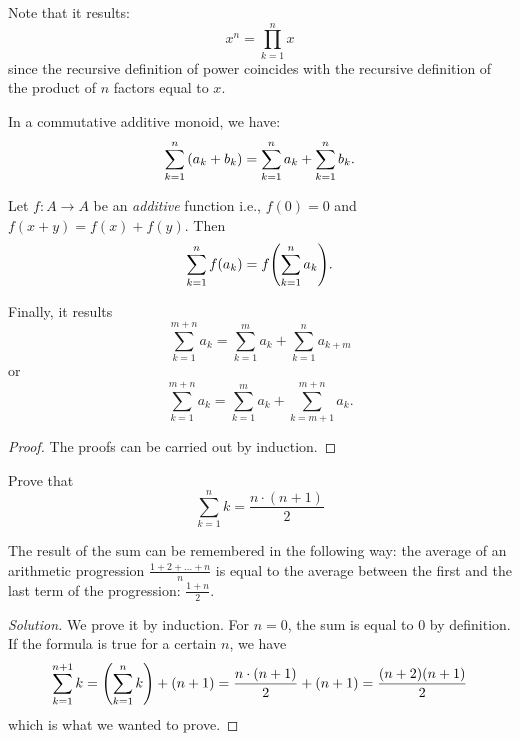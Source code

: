 Note that it results:
\[
  x^n = \prod_{k=1}^n x
\]
since the recursive definition of power coincides 
with the recursive definition of 
the product of $n$ factors equal to $x$.

\begin{theorem}
In a commutative additive monoid, we have:
  \[
  \sum_{k=1}^n  {\left( a_k + b_k \right)} 
  = \sum_{k=1}^n a_k + \sum_{k=1}^n b_k.
  \]

Let $f\colon A\to A$ be an \emph{additive} function
i.e., $f(0) = 0$ and $f(x+y)=f(x)+f(y)$.
Then 
  \[
    \sum_{k=1}^n  f(a_k) = f{\left( \sum_{k=1}^n a_k \right)}.
  \]

Finally, it results 
  \[
  \sum_{k=1}^{m+n} a_k = \sum_{k=1}^m a_k + \sum_{k=1}^n a_{k+m}
  \]
or 
  \[
  \sum_{k=1}^{m+n} a_k = \sum_{k=1}^m a_k + \sum_{k=m+1}^{m+n} a_k.  
  \]
\end{theorem}
\begin{proof}
  The proofs can be carried out 
  by induction.
\end{proof}

\begin{exercise}
  \label{ex:somma_lineare}%
  Prove that 
  \[
    \sum_{k=1}^n k = \frac{n\cdot (n+1)}{2}
  \]
\end{exercise}
The result of the sum can be remembered in the following way:
the average of an arithmetic progression $\frac{1+2+ \dots + n}{n}$ 
is equal to the average between the first 
and the last term of the progression: $\frac{1+n}{2}$.
\begin{proof}[Solution]
We prove it by induction.
For $n=0$, the sum is equal to $0$ by definition.
If the formula is true for a certain $n$, we have 
\[
  \sum_{k=1}^{n+1} k = {\left( \sum_{k=1}^n k \right)} + (n+1)
   = \frac{n\cdot(n+1)}{2} + (n+1) 
   = \frac{(n+2)(n+1)}{2}
\]
which is what we wanted to prove.
\end{proof}

